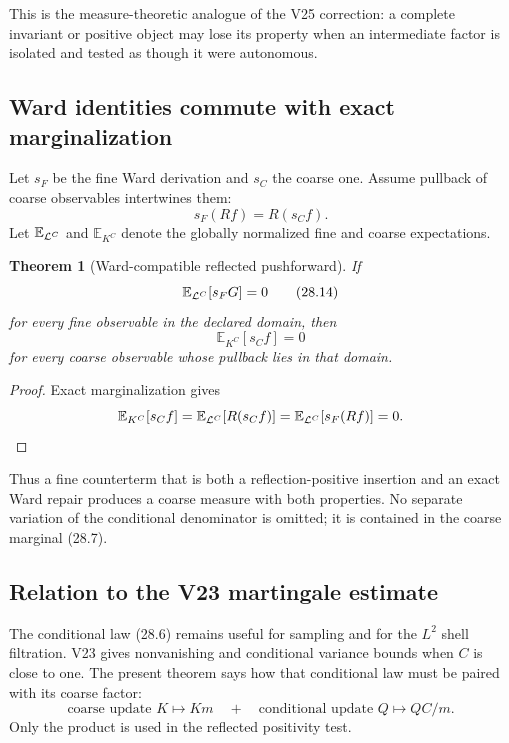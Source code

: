 \documentclass[11pt]{article}
\newtheorem{theorem}{Theorem}[section]
\theoremstyle{remark}
\begin{document}
This is the measure-theoretic analogue of the V25 correction: a
complete invariant or positive object may lose its property when an
intermediate factor is isolated and tested as though it were
autonomous.

\subsection{Ward identities commute with exact marginalization}

Let \(s_F\) be the fine Ward derivation and \(s_C\) the coarse one.
Assume pullback of coarse observables intertwines them:
\[
                         s_F(Rf)=R(s_Cf).                   \tag{28.13}
\]
Let \({\mathbb E}_{{\cal L}^C}\) and
\({\mathbb E}_{K^C}\) denote the globally normalized fine and coarse
expectations.

\begin{theorem}[Ward-compatible reflected pushforward]
\label{thm:v12v28-Ward}
If
\[
                         {\mathbb E}_{{\cal L}^C}[s_FG]=0   \tag{28.14}
\]
for every fine observable in the declared domain, then
\[
                         \boxed{
 {\mathbb E}_{K^C}[s_Cf]=0}                                \tag{28.15}
\]
for every coarse observable whose pullback lies in that domain.
\end{theorem}

\begin{proof}
Exact marginalization gives
\[
 {\mathbb E}_{K^C}[s_Cf]
 =
 {\mathbb E}_{{\cal L}^C}[R(s_Cf)]
 =
 {\mathbb E}_{{\cal L}^C}[s_F(Rf)]
 =0.
\]
\end{proof}

Thus a fine counterterm that is both a reflection-positive insertion
and an exact Ward repair produces a coarse measure with both
properties.  No separate variation of the conditional denominator
is omitted; it is contained in the coarse marginal (28.7).

\subsection{Relation to the V23 martingale estimate}

The conditional law (28.6) remains useful for sampling and for the
\(L^2\) shell filtration.  V23 gives nonvanishing and conditional
variance bounds when \(C\) is close to one.  The present theorem says
how that conditional law must be paired with its coarse factor:
\[
 \boxed{
 \text{coarse update }K\mapsto Km
 \quad+\quad
 \text{conditional update }Q\mapsto QC/m.}                 \tag{28.16}
\]
Only the product is used in the reflected positivity test.
\end{document}
